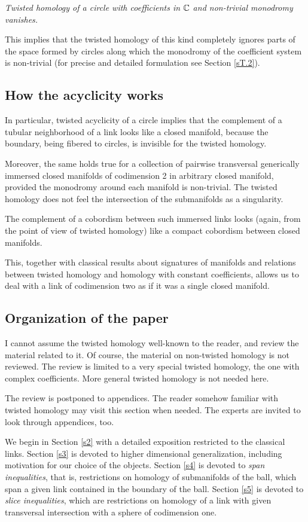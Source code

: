 \documentclass{article}
\numberwithin{equation}{section}
\begin{document}
{\it Twisted homology of a circle with coefficients in $\mathbb C$ and 
non-trivial monodromy vanishes.}

This implies that the twisted homology of this kind completely
ignores parts of the space formed by circles along which
the monodromy of the coefficient system is non-trivial 
(for precise and detailed formulation see Section \ref{sT.2}).

\subsection{How the acyclicity works}\label{s1.3}
In particular, twisted acyclicity of a circle implies 
that the complement of a tubular neighborhood of a
link looks like a closed manifold, because the boundary, being 
fibered to circles, is invisible for the twisted homology. 

Moreover, the same holds true for a collection of pairwise 
transversal generically immersed closed manifolds of codimension 2 in 
arbitrary closed manifold, provided the monodromy around 
each manifold is non-trivial.
The twisted homology does not feel the intersection of the
submanifolds as a singularity. 

The complement of a cobordism between such immersed 
links looks (again, from the point of view of twisted 
homology) like a compact cobordism between closed manifolds.

This, together with classical results about signatures of manifolds 
and relations between twisted homology and
homology with constant coefficients, allows us to deal with
a link of codimension two as if it was a single closed manifold.

\subsection{Organization of the paper}\label{s1.4}
I cannot assume the twisted homology well-known to the reader,
and review the material related to it. Of course, the material on 
non-twisted homology is not reviewed. The review is
limited to a very special twisted homology, the one with 
complex coefficients.
More general twisted homology is not needed here.

The review is postponed to appendices. 
The reader somehow familiar with twisted homology may visit
this section when needed.  The experts are invited
to look through appendices, too. 

We begin in Section \ref{s2} with a detailed exposition restricted 
to the classical links. Section \ref{s3} is devoted to higher
dimensional generalization, including motivation for our choice of 
the objects. Section \ref{s4} is devoted to {\sl span inequalities\/}, 
that is,
restrictions on homology of submanifolds of the ball, which span 
a given link contained in the boundary of the ball. Section \ref{s5} 
is devoted to {\sl slice inequalities\/}, which are restrictions on
homology of a link with given transversal intersection with a sphere
of codimension one.  
\end{document}
